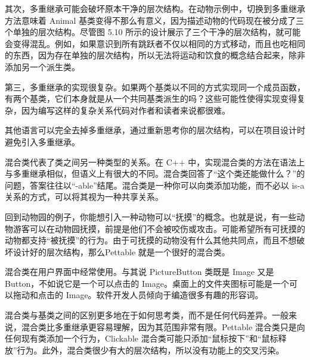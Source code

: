 其次，多重继承可能会破坏原本干净的层次结构。在动物示例中，切换到多重继承方法意味着 Animal 基类变得不那么有意义，因为描述动物的代码现在被分成了三个单独的层次结构。尽管图 5.10 所示的设计展示了三个干净的层次结构，就可能会变得混乱。例如，如果意识到所有跳跃者不仅以相同的方式移动，而且也吃相同的东西，因为存在单独的层次结构，所以无法将运动和饮食的概念结合起来，除非添加另一个派生类。

第三，多重继承的实现很复杂。如果两个基类以不同的方式实现同一个成员函数，有两个基类，它们本身就是从一个共同基类派生的吗？这些可能性使得实现变得复杂，因为编写这样的复杂关系代码对作者和读者来说都很难。

其他语言可以完全去掉多重继承，通过重新思考你的层次结构，可以在项目设计时避免引入多重继承。


混合类代表了类之间另一种类型的关系。在 C++ 中，实现混合类的方法在语法上与多重继承相似，但语义上有很大的不同。混合类回答了“这个类还能做什么？”的问题，答案往往以“-able”结尾。混合类是一种你可以向类添加功能，而不必以 is-a 关系的方式，可以将其视为一种共享关系。

回到动物园的例子，你能想引入一种动物可以“抚摸”的概念。也就是说，有一些动物游客可以在动物园抚摸，前提是他们不会被咬伤或攻击。可能希望所有可抚摸的动物都支持“被抚摸”的行为。由于可抚摸的动物没有什么其他共同点，而且不想破坏设计好的层次结构，那么Pettable 就是一个很好的混合类。

混合类在用户界面中经常使用。与其说 PictureButton 类既是 Image 又是 Button，不如说它是一个可以点击的 Image。桌面上的文件夹图标可能是一个可以拖动和点击的 Image。软件开发人员倾向于编造很多有趣的形容词。

混合类与基类之间的区别更多地在于如何思考类，而不是任何代码差异。一般来说，混合类比多重继承更容易理解，因为其范围非常有限。Pettable 混合类只是向任何现有类添加一个行为，Clickable 混合类可能只添加“鼠标按下”和“鼠标释放”行为。此外，混合类很少有大的层次结构，所以没有功能上的交叉污染。





























